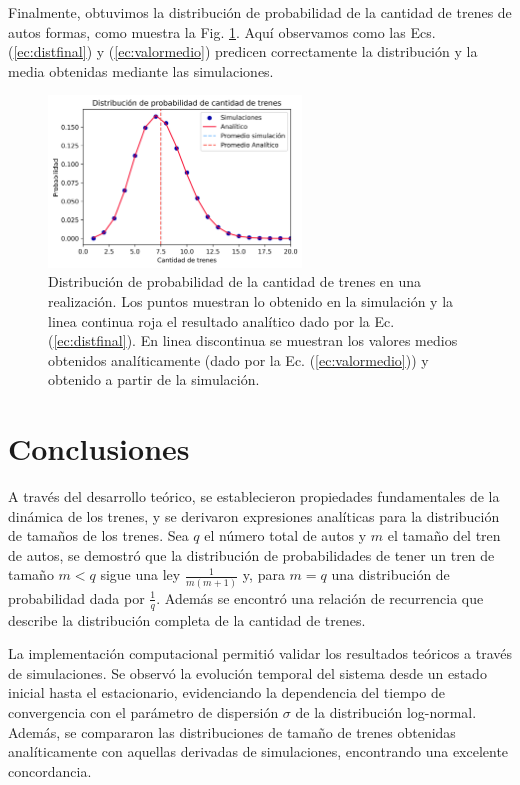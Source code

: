 \documentclass[letterpaper,12pt]{article}
\theoremstyle{plain}
\begin{document}
Finalmente, obtuvimos la distribución de probabilidad de la cantidad de trenes de autos formas, como muestra la Fig. \ref{fig:ntrenes}. Aquí observamos como las Ecs. (\ref{ec:distfinal}) y (\ref{ec:valormedio}) predicen correctamente la distribución y la media obtenidas mediante las simulaciones.

\begin{figure}[h]
    \centering
    \includegraphics[width=0.6\textwidth]{ntrenes.png}
    \caption{Distribución de probabilidad de la cantidad de trenes en una realización. Los puntos muestran lo obtenido en la simulación y la linea continua roja el resultado analítico dado por la Ec. (\ref{ec:distfinal}). En linea discontinua se muestran los valores medios obtenidos analíticamente (dado por la Ec. (\ref{ec:valormedio})) y obtenido a partir de la simulación.}
    \label{fig:ntrenes}
\end{figure}

\section{Conclusiones}

A través del desarrollo teórico, se establecieron propiedades fundamentales de la dinámica de los trenes, y se derivaron expresiones analíticas para la distribución de tamaños de los trenes. Sea $q$ el número total de autos y $m$ el tamaño del tren de autos, se demostró que la distribución de probabilidades de tener un tren de tamaño $m<q$ sigue una ley $\frac{1}{m(m+1)}$ y, para $m=q$ una distribución de probabilidad dada por $\frac{1}{q}$. Además se encontró una relación de recurrencia que describe la distribución completa de la cantidad de trenes.

La implementación computacional permitió validar los resultados teóricos a través de simulaciones. Se observó la evolución temporal del sistema desde un estado inicial hasta el estacionario, evidenciando la dependencia del tiempo de convergencia con el parámetro de dispersión $\sigma$ de la distribución log-normal. Además, se compararon las distribuciones de tamaño de trenes obtenidas analíticamente con aquellas derivadas de simulaciones, encontrando una excelente concordancia.
\end{document}
